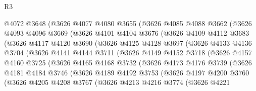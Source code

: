 \begin{lexlean}{R3}
\begin{coremodule}
          @4072
          @3648
          (@3626
            @4077
            @4080
            @3655
            (@3626
              @4085
              @4088
              @3662
              (@3626
                @4093
                @4096
                @3669
                (@3626
                  @4101
                  @4104
                  @3676
                  (@3626
                    @4109
                    @4112
                    @3683
                    (@3626
                      @4117
                      @4120
                      @3690
                      (@3626
                        @4125
                        @4128
                        @3697
                        (@3626
                          @4133
                          @4136
                          @3704
                          (@3626
                            @4141
                            @4144
                            @3711
                            (@3626
                              @4149
                              @4152
                              @3718
                              (@3626
                                @4157
                                @4160
                                @3725
                                (@3626
                                  @4165
                                  @4168
                                  @3732
                                  (@3626
                                    @4173
                                    @4176
                                    @3739
                                    (@3626
                                      @4181
                                      @4184
                                      @3746
                                      (@3626
                                        @4189
                                        @4192
                                        @3753
                                        (@3626
                                          @4197
                                          @4200
                                          @3760
                                          (@3626
                                            @4205
                                            @4208
                                            @3767
                                            (@3626
                                              @4213
                                              @4216
                                              @3774
                                              (@3626
                                                @4221

\end{coremodule}
\end{lexlean}
